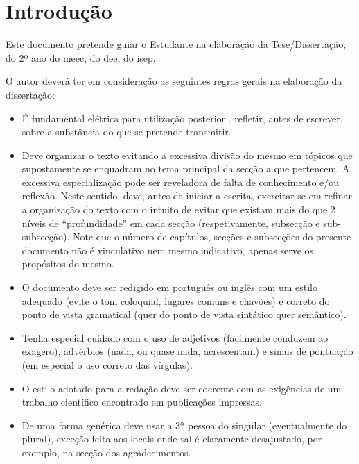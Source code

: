 
\chapter{Introdução} 	%
\label{Chapter1} 		%


Este documento pretende guiar o Estudante na elaboração da Tese/Dissertação, do 2º ano do \ac{meec}, do \ac{dee}, do \ac{isep}.

O autor deverá ter em consideração as seguintes regras gerais na elaboração da dissertação:

\begin{itemize}
	\item É fundamental elétrica para utilização posterior
\cite{enel_bess}. refletir, antes de escrever, sobre a substância do que se pretende transmitir.
	\item Deve organizar o texto evitando a excessiva divisão do mesmo em tópicos que supostamente se enquadram no tema principal da secção a que pertencem. A excessiva especialização pode ser reveladora de falta de conhecimento e/ou reflexão. Neste sentido, deve, antes de iniciar a escrita, exercitar-se em refinar a organização do texto com o intuito de evitar que existam mais do que 2 níveis de ``profundidade'' em cada secção (respetivamente, subsecção e sub-subsecção). Note que o número de capítulos, secções e subsecções do presente documento não é vinculativo nem mesmo indicativo, apenas serve os propósitos do mesmo.
	\item O documento deve ser redigido em português ou inglês com um estilo adequado (evite o tom coloquial, lugares comuns e chavões) e correto do ponto de vista gramatical (quer do ponto de vista sintático quer semântico).
	\item Tenha especial cuidado com o uso de adjetivos (facilmente conduzem ao exagero), advérbios (nada, ou quase nada, acrescentam) e sinais de pontuação (em especial o uso correto das vírgulas).
	\item O estilo adotado para a redação deve ser coerente com as exigências de um trabalho científico encontrado em publicações impressas.
	\item De uma forma genérica deve usar a 3ª pessoa do singular (eventualmente do plural), exceção feita aos locais onde tal é claramente desajustado, por exemplo, na secção dos agradecimentos.

\end{itemize}
